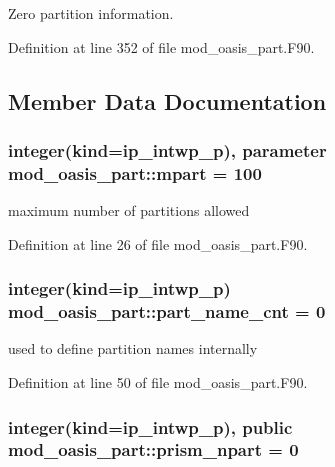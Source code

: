Zero partition information. 



Definition at line 352 of file mod\+\_\+oasis\+\_\+part.\+F90.



\subsection{Member Data Documentation}
\hypertarget{classmod__oasis__part_ab68d087792db0351181c9a97025d793b}{
\subsubsection[{mpart}]{\setlength{\rightskip}{0pt plus 5cm}integer(kind=ip\+\_\+intwp\+\_\+p), parameter mod\+\_\+oasis\+\_\+part\+::mpart = 100\hspace{0.3cm}{\ttfamily [private]}}}\label{classmod__oasis__part_ab68d087792db0351181c9a97025d793b}


maximum number of partitions allowed 



Definition at line 26 of file mod\+\_\+oasis\+\_\+part.\+F90.

\hypertarget{classmod__oasis__part_a8cee930f023feb7bcad4a0cab0b490a1}{
\subsubsection[{part\+\_\+name\+\_\+cnt}]{\setlength{\rightskip}{0pt plus 5cm}integer(kind=ip\+\_\+intwp\+\_\+p) mod\+\_\+oasis\+\_\+part\+::part\+\_\+name\+\_\+cnt = 0\hspace{0.3cm}{\ttfamily [private]}}}\label{classmod__oasis__part_a8cee930f023feb7bcad4a0cab0b490a1}


used to define partition names internally 



Definition at line 50 of file mod\+\_\+oasis\+\_\+part.\+F90.

\hypertarget{classmod__oasis__part_ac8340e63b159a9786ad8fffabd1d47f8}{
\subsubsection[{prism\+\_\+npart}]{\setlength{\rightskip}{0pt plus 5cm}integer(kind=ip\+\_\+intwp\+\_\+p), public mod\+\_\+oasis\+\_\+part\+::prism\+\_\+npart = 0}}\label{classmod__oasis__part_ac8340e63b159a9786ad8fffabd1d47f8}


